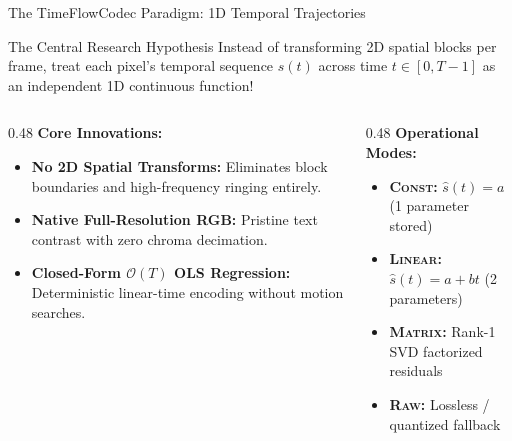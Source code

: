 \documentclass[aspectratio=169, 10pt]{beamer}
\begin{document}
\begin{frame}{The TimeFlowCodec Paradigm: 1D Temporal Trajectories}
    \begin{alertblock}{The Central Research Hypothesis}
        Instead of transforming 2D spatial blocks per frame, treat each pixel's temporal sequence $s(t)$ across time $t \in [0, T-1]$ as an independent 1D continuous function!
    \end{alertblock}
    \vspace{2mm}
    \begin{columns}
        \begin{column}{0.48\textwidth}
            \textbf{Core Innovations:}
            \begin{itemize}
                \item \textbf{No 2D Spatial Transforms:} Eliminates block boundaries and high-frequency ringing entirely.
                \item \textbf{Native Full-Resolution RGB:} Pristine text contrast with zero chroma decimation.
                \item \textbf{Closed-Form $\mathcal{O}(T)$ OLS Regression:} Deterministic linear-time encoding without motion searches.
            \end{itemize}
        \end{column}
        \begin{column}{0.48\textwidth}
            \textbf{Operational Modes:}
            \begin{itemize}
                \item \textbf{\textsc{Const}:} $\hat{s}(t) = a$ (1 parameter stored)
                \item \textbf{\textsc{Linear}:} $\hat{s}(t) = a + bt$ (2 parameters)
                \item \textbf{\textsc{Matrix}:} Rank-1 SVD factorized residuals
                \item \textbf{\textsc{Raw}:} Lossless / quantized fallback
            \end{itemize}
        \end{column}
    \end{columns}
\end{frame}
\end{document}

